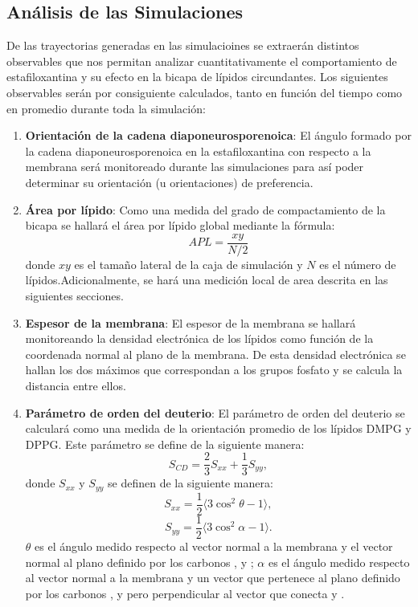 \subsection*{Análisis de las Simulaciones}
De las trayectorias generadas en las simulacioines se extraerán distintos observables que nos permitan analizar cuantitativamente el comportamiento de estafiloxantina y su efecto en la bicapa de lípidos circundantes. Los siguientes observables serán por consiguiente calculados, tanto en función del tiempo como en promedio durante toda la simulación:\\
\begin{enumerate}
\item \textbf{Orientación de la cadena diaponeurosporenoica}: El ángulo formado por la cadena diaponeurosporenoica en la estafiloxantina con respecto a la membrana será monitoreado durante las simulaciones para así poder determinar su orientación (u orientaciones) de preferencia.
\item \textbf{Área por lípido}: Como una medida del grado de compactamiento de la bicapa se hallará el área por lípido global mediante la fórmula:
\begin{equation}
APL=\frac{xy}{N/2}
\end{equation}
donde $xy$ es el tamaño lateral de la caja de simulación y $N$ es el número de lípidos.Adicionalmente, se hará una medición local de area descrita en las siguientes secciones.
\item \textbf{Espesor de la membrana}:
El espesor de la membrana se hallará monitoreando la densidad electrónica de los lípidos como función de la coordenada normal al plano de la membrana. De esta densidad electrónica se hallan los dos máximos que correspondan a los grupos fosfato y se calcula la distancia entre ellos.
\item  \textbf{Parámetro de orden del deuterio}:
El parámetro de orden del deuterio se calculará como una medida de la orientación promedio de los lípidos DMPG y DPPG. Este parámetro se define de la siguiente manera: \cite{Aponte-santamariaSupplementaryFigures}\\
\begin{equation}
S_{CD}=\frac{2}{3}S_{xx}+\frac{1}{3}S_{yy},
 \end{equation}
donde $S_{xx}$ y $S_{yy}$ se definen de la siguiente manera:
\begin{equation}
S_{xx}=\frac{1}{2}\langle 3\cos^2\theta-1\rangle,
 \end{equation}
\begin{equation}
S_{yy}=\frac{1}{2}\langle 3\cos^2\alpha-1\rangle.
 \end{equation}
$\theta$ es el ángulo medido respecto al vector normal a la membrana y el vector normal al plano definido por los carbonos ,  y ; $\alpha$ es el ángulo medido respecto al vector normal a la membrana y un vector que pertenece al plano definido por los carbonos ,  y  pero perpendicular al vector que conecta   y .


\end{enumerate}
